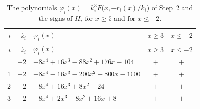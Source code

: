 \documentclass[11pt]{article}
\begin{document}
\begingroup\footnotesize
\setlength{\LTcapwidth}{\textwidth}
\begin{longtable}{@{}rrlcc@{}}
\caption{The polynomials $\varphi_i(x)=k_i^3F\bigl(x,-r_i(x)/k_i\bigr)$ of Step~2 and the signs of $H_i$ for $x\geq3$ and for $x\leq-2$.}\label{tab:phi}\\
\hline $i$ & $k_i$ & $\varphi_i(x)$ & $x\geq3$ & $x\leq-2$\\\hline\endfirsthead\hline $i$ & $k_i$ & $\varphi_i(x)$ & $x\geq3$ & $x\leq-2$\\\hline\endhead\hline\endfoot
0 & $-2$ & $-8x^{4}+16x^{3}-88x^{2}+176x-104$ & $+$ & $+$\\
1 & $-2$ & $-8x^{4}-16x^{3}-200x^{2}-800x-1000$ & $+$ & $+$\\
2 & $-2$ & $-8x^{4}+16x^{3}+8x^{2}+24$ & $+$ & $+$\\
3 & $-2$ & $-8x^{4}+2x^{3}-8x^{2}+16x+8$ & $+$ & $+$\\
\end{longtable}
\endgroup
\end{document}
